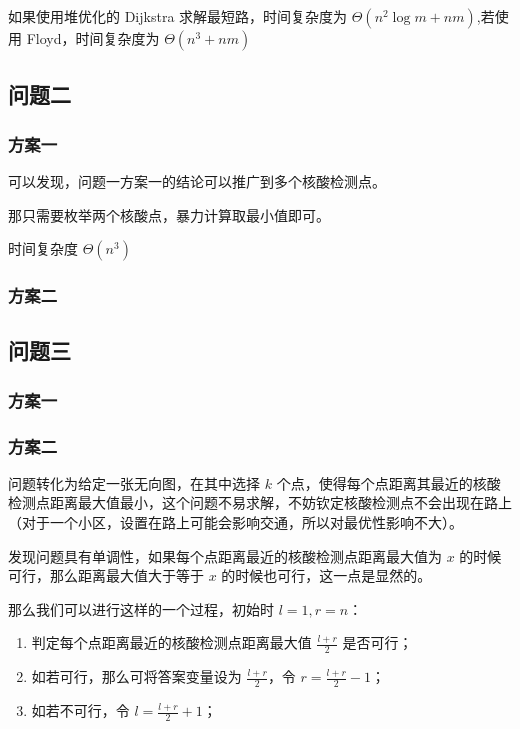 \documentclass{cumcmthesis}
\begin{document}
如果使用堆优化的 Dijkstra 求解最短路，时间复杂度为 $\Theta(n^2\log m + nm)$,若使用 Floyd，时间复杂度为 $\Theta(n^3 + nm)$

\subsection{问题二}

\subsubsection{方案一}

可以发现，问题一方案一的结论可以推广到多个核酸检测点。

那只需要枚举两个核酸点，暴力计算取最小值即可。

时间复杂度 $\Theta(n^3)$

\subsubsection{方案二}

\subsection{问题三}

\subsubsection{方案一}

\subsubsection{方案二}

问题转化为给定一张无向图，在其中选择 $k$ 个点，使得每个点距离其最近的核酸检测点距离最大值最小，这个问题不易求解，不妨钦定核酸检测点不会出现在路上（对于一个小区，设置在路上可能会影响交通，所以对最优性影响不大）。

发现问题具有单调性，如果每个点距离最近的核酸检测点距离最大值为 $x$ 的时候可行，那么距离最大值大于等于 $x$ 的时候也可行，这一点是显然的。

那么我们可以进行这样的一个过程，初始时 $l=1,r=n$：

\begin{enumerate}
    \item 判定每个点距离最近的核酸检测点距离最大值 $\frac{l+r}{2}$ 是否可行；
    \item 如若可行，那么可将答案变量设为 $\frac{l+r}{2}$，令 $r = \frac{l+r}{2}-1$；
    \item 如若不可行，令 $l = \frac{l+r}{2} + 1$；
\end{enumerate}
\end{document}
